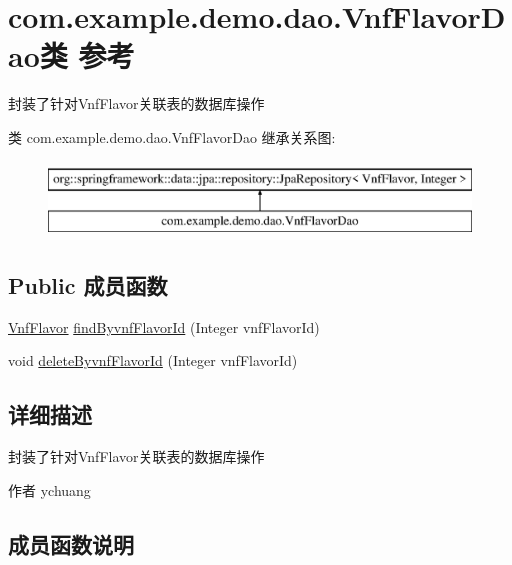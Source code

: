 \hypertarget{interfacecom_1_1example_1_1demo_1_1dao_1_1_vnf_flavor_dao}{}\section{com.\+example.\+demo.\+dao.\+Vnf\+Flavor\+Dao类 参考}
\label{interfacecom_1_1example_1_1demo_1_1dao_1_1_vnf_flavor_dao}


封装了针对\+Vnf\+Flavor关联表的数据库操作  


类 com.\+example.\+demo.\+dao.\+Vnf\+Flavor\+Dao 继承关系图\+:\begin{figure}[H]
\begin{center}
\leavevmode
\includegraphics[height=2.000000cm]{interfacecom_1_1example_1_1demo_1_1dao_1_1_vnf_flavor_dao}
\end{center}
\end{figure}
\subsection*{Public 成员函数}
\begin{DoxyCompactItemize}
\item 
\mbox{\hyperlink{classcom_1_1example_1_1demo_1_1modular_1_1_vnf_flavor}{Vnf\+Flavor}} \mbox{\hyperlink{interfacecom_1_1example_1_1demo_1_1dao_1_1_vnf_flavor_dao_a3a58a6f91a36fdce9dfa509de05e2b81}{find\+Byvnf\+Flavor\+Id}} (Integer vnf\+Flavor\+Id)
\item 
void \mbox{\hyperlink{interfacecom_1_1example_1_1demo_1_1dao_1_1_vnf_flavor_dao_aee915df96031ffe7626679fc364673aa}{delete\+Byvnf\+Flavor\+Id}} (Integer vnf\+Flavor\+Id)
\end{DoxyCompactItemize}


\subsection{详细描述}
封装了针对\+Vnf\+Flavor关联表的数据库操作 

\begin{DoxyAuthor}{作者}
ychuang 
\end{DoxyAuthor}


\subsection{成员函数说明}
\mbox{\label{interfacecom_1_1example_1_1demo_1_1dao_1_1_vnf_flavor_dao_aee915df96031ffe7626679fc364673aa}} 
